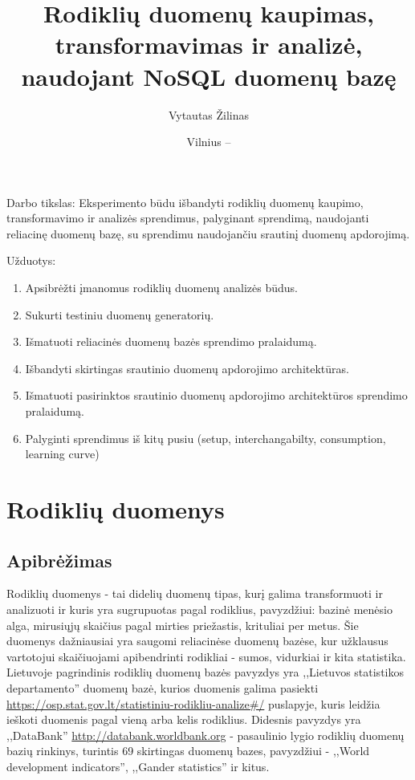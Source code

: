\documentclass{VUMIFPSkursinis}
\title{Rodiklių duomenų kaupimas, transformavimas ir analizė, naudojant NoSQL duomenų bazę}
\author{Vytautas Žilinas}
\date{Vilnius – \the\year}
\begin{document}
	
\maketitle
\cleardoublepage{}
\setcounter{page}{2}

\tableofcontents


Darbo tikslas: Eksperimento būdu išbandyti rodiklių duomenų kaupimo, transformavimo ir analizės sprendimus, palyginant sprendimą, 
naudojanti reliacinę duomenų bazę, su sprendimu naudojančiu srautinį duomenų apdorojimą.

Užduotys:
\begin{enumerate}
    \item Apsibrėžti įmanomus rodiklių duomenų analizės būdus.
    \item Sukurti testiniu duomenų generatorių.
    \item Išmatuoti reliacinės duomenų bazės sprendimo pralaidumą.
    \item Išbandyti skirtingas srautinio duomenų apdorojimo architektūras.
    \item Išmatuoti pasirinktos srautinio duomenų apdorojimo architektūros sprendimo pralaidumą.
    \item Palyginti sprendimus iš kitų pusiu (setup, interchangabilty, consumption, learning curve)
\end{enumerate}


\section{Rodiklių duomenys}

\subsection{Apibrėžimas}

Rodiklių duomenys - tai didelių duomenų tipas, kurį galima transformuoti ir analizuoti ir kuris yra sugrupuotas pagal rodiklius, 
pavyzdžiui: bazinė menėsio alga, mirusiųjų skaičius pagal mirties priežastis, krituliai per metus. Šie duomenys dažniausiai yra saugomi reliacinėse duomenų bazėse, 
kur užklausus vartotojui skaičiuojami apibendrinti rodikliai - sumos, vidurkiai ir kita statistika.
Lietuvoje pagrindinis rodiklių duomenų bazės pavyzdys yra ,,Lietuvos statistikos departamento'' duomenų bazė, kurios duomenis galima pasiekti
\url{https://osp.stat.gov.lt/statistiniu-rodikliu-analize#/} puslapyje, kuris leidžia ieškoti duomenis pagal vieną arba kelis rodiklius. Didesnis pavyzdys yra ,,DataBank''
\url{http://databank.worldbank.org} - pasaulinio lygio rodiklių duomenų bazių rinkinys, turintis 69 skirtingas duomenų bazes, pavyzdžiui - ,,World development indicators'',
,,Gander statistics'' ir kitus\cite{databank-stats}.
\end{document}
